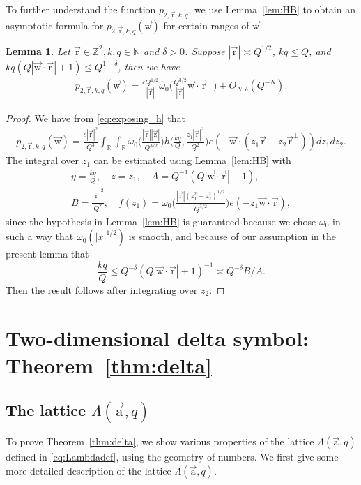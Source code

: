 \documentclass[letterpaper,11pt]{amsart}
\numberwithin{equation}{section}
\newtheorem{lemma}[theorem]{Lemma}
\theoremstyle{definition}
\numberwithin{equation}{section}
\newcommand{\ZZ}{\mathbb{Z}}
\newcommand{\NN}{\mathbb{N}}
\renewcommand{\hat}{\widehat}
\newcommand{\ua}{\vec{\mathrm{a}}}
\newcommand{\ur}{\vec{\mathrm{r}}}
\newcommand{\uz}{{\vec{\mathrm{z}}}}
\newcommand{\uw}{{\vec{\mathrm{w}}}}
\renewcommand{\hat}{\widehat}
\newcommand{\R}{\mathbb{R}}
\begin{document}
To further understand the function $p_{2,\ur,k,q}$, we use Lemma~\ref{lem:HB} to obtain an asymptotic formula for $p_{2,\ur,k,q}(\uw)$ for certain ranges of $\uw$. 
\begin{lemma}\label{lem:stationary}
	Let $\ur\in \ZZ^2, k, q\in \NN$ and $\delta>0$. Suppose \(|\ur|\asymp Q^{1/2}\), $kq\leq Q$, and $kq ( Q|\uw\cdot \ur|+1)\leq Q^{1-\delta}$, then we have 
	\begin{align*}
	p_{2,\ur,k,q}(\uw)=\frac{cQ^{1/2}}{|\ur|}\hat{\omega}_0\Big(\frac{Q^{3/2}}{|\ur|} \uw\cdot\ur^\perp\Big)+O_{N,\delta}(Q^{-N}).
	\end{align*}
\end{lemma}
\begin{proof}
	We have from \eqref{eq:exposing_h} that
	\begin{align*}
	p_{2,\ur,k,q}(\uw)=\frac{c|\ur|^2}{Q^3}\int_{\R}\int_{\R}\omega_0\Big(\frac{|\ur||\uz|}{Q^{3/2}}\Big)h\Big(\frac{k q}{Q}, \frac{z_1|\ur|^2}{Q^2}\Big)e(-\uw\cdot (z_1\ur+z_2\ur^{\perp}))dz_1 dz_2.
	\end{align*}
	The integral over $z_1$ can be estimated using Lemma~\ref{lem:HB} with 
	\begin{align*}
	y= 
	\frac{kq}{Q},\quad
	z=z_1,\quad
	A=Q^{-1}(Q|\uw\cdot \ur|+1), \quad\quad \quad\\
	B= \frac{|\ur|^2}{ Q^2}, \quad 
	f(z_1)=\omega_0\Big(\frac{|\ur|(z_1^2+z_2^2)^{1/2}}{Q^{3/2}}\Big)e(-z_1\uw\cdot \ur),
	\end{align*}
	since the hypothesis in Lemma~\ref{lem:HB}  is guaranteed because we chose $\omega_0$ in such a way that $\omega_0(|x|^{1/2})$ is smooth, and because of our assumption in the present lemma that
	\[
	\frac{kq}{Q}
	\leq Q^{-\delta}( Q|\uw\cdot \ur|+1)^{-1}\asymp Q^{-\delta} B/A. 	\]
	Then the result follows after integrating over $z_2$.
\end{proof}


\section{Two-dimensional delta symbol: Theorem~\ref{thm:delta}} \label{sec:delta proof}\subsection{The lattice \( \Lambda(\ua,q) \)} 
To prove Theorem~\ref{thm:delta}, we show various properties of the lattice $\Lambda(\ua, q)$ defined in \eqref{eq:Lambdadef}, using the geometry of numbers. We first give some more detailed description of the lattice $\Lambda(\ua, q)$.
\end{document}
